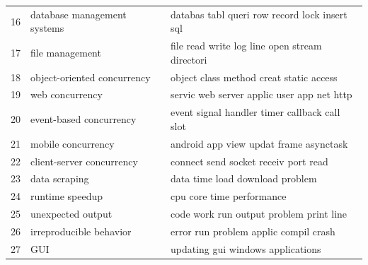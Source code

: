 \begin{table}[tbp]
\begin{tabular}{p{.15in}p{2.25in}p{3.1in}}
16&database management systems& 
databas tabl queri row record lock insert sql\\

17&file management& 
file read write log line open stream directori\\

18&object-oriented concurrency& 
object class method creat static access\\

19&web concurrency& 
servic web server applic user app net http\\

20&event-based concurrency& 
event signal handler timer callback call slot\\

21&mobile concurrency& 
android app view updat frame asynctask\\

22&client-server concurrency& 
connect send socket receiv port read\\

23&data scraping& 
data time load download problem\\

24&runtime speedup& 
cpu core time performance\\

25&unexpected output& 
code work run output problem print line\\

26&irreproducible behavior& 
error run problem applic compil crash\\

27&GUI& 
updating gui windows applications\\ \hline
\end{tabular}
\end{table}

